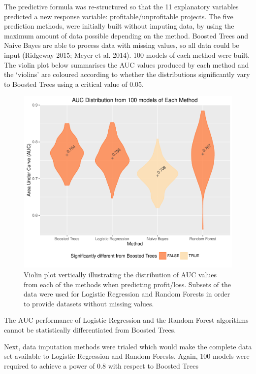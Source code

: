 \documentclass[]{elsarticle} %
\makeatletter
\def\maxwidth{\ifdim\Gin@nat@width>\linewidth\linewidth
\else\Gin@nat@width\fi}
\let\Oldincludegraphics\includegraphics
\renewcommand{\includegraphics}[1]{\Oldincludegraphics[width=\maxwidth]{#1}}
\makeatother
\begin{document}
The predictive formula was re-structured so that the 11 explanatory
variables predicted a new response variable: profitable/unprofitable
projects. The five prediction methods, were initially built without
imputing data, by using the maximum amount of data possible depending on
the method. Boosted Trees and Naive Bayes are able to process data with
missing values, so all data could be input (Ridgeway 2015; Meyer et al.
2014). 100 models of each method were built. The violin plot below
summarises the AUC values produced by each method and the `violins' are
coloured according to whether the distributions significantly vary to
Boosted Trees using a critical value of 0.05.

\begin{figure}[htbp]
\centering
\includegraphics{Consulting_Profitability_Paper_files/figure-latex/reduced_violin-1.pdf}
\caption{Violin plot vertically illustrating the distribution of AUC
values from each of the methods when predicting profit/loss. Subsets of
the data were used for Logistic Regression and Random Forests in order
to provide datasets without missing values.}
\end{figure}

The AUC performance of Logistic Regression and the Random Forest
algorithms cannot be statistically differentiated from Boosted Trees.

Next, data imputation methods were trialed which would make the complete
data set available to Logistic Regression and Random Forests. Again, 100
models were required to achieve a power of 0.8 with respect to Boosted
Trees
\end{document}
